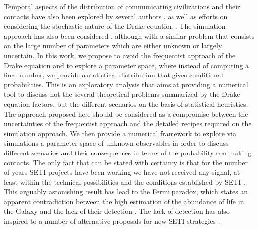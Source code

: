 Temporal aspects of the distribution of communicating civilizations
and their contacts have also been explored by several authors
\citep{fogg_temporal_1987, forgan_spatiotemporal_2011,
balbi_impact_2018, balb_spatiotemporal_2018, horvat_impact_2011},
%
as well as efforts on considering the stochastic nature of the Drake
equation \citep{glade_stochastic_2011}.
%
The simulation approach has also been considered
\citep{forgan_evaluating_2015, vukotic_grandeur_2016,
murante_simulating_2015, forgan_numerical_2009, forgan_galactic_2017},
although with a similar problem that consists on the large number of
parameters which are either unknown or largely uncertain.
%
%
%
In this work, we propose to avoid the frequentist approach of the
Drake equation and to explore a parameter space, where instead of
computing a final number, we provide a statistical distribution that
gives conditional probabilities.
%
This is an exploratory analysis that aims at providing a numerical
tool to discuss not the several theoretical problems summarized by the
Drake equation factors, but the different scenarios on the basis of
statistical heuristics.
%
The approach proposed here should be considered as a compromise between
the uncertainties of the frequentist approach and the detailed recipes
required on the simulation approach.
%
We then provide a numerical framework to explore via simulations a
parameter space of unknown observables in order to discuss different
scenarios and their consequences in terms of the probability con
making contacts.
%
The only fact that can be stated with certainty is that for the number
of years SETI projects have been working we have not received any
signal, at least within the technical possibilities and the conditions
established by SETI \citep{tarter_search_2001}.
%
This arguably astonishing result has lead to the Fermi paradox, which
states an apparent contradiction between the high estimation of the
abundance of life in the Galaxy and the lack of their detection
\citep{vanhouten_isthere_2017}.
%
The lack of detection has also inspired to a number of alternative
proposals for new SETI strategies \citep{forgan_exoplanet_2017,
balbi_impact_2018, loeb_eavesdropping_2006, maccone_KLT_2010,
tarter_advancing_2009, enriquez_breakthrough_2017, loeb_relative_2016,
maccone_SETI_2011,  lingam_relative_2019, wright_theGsearch_2015,
maccone_SETI_2013, maccone_lognormals_2014, harp_application_2018,
forgan_possibility_2013, forgan_galactic_2017, funes_searching_2019}.
 


